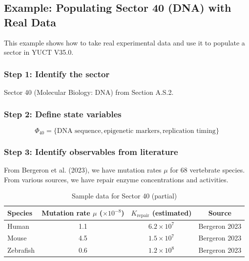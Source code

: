 \documentclass[13pt,a4paper]{article}
\begin{document}
	\subsection*{Example: Populating Sector 40 (DNA) with Real Data}
	
	This example shows how to take real experimental data and use it to populate a sector in YUCT V35.0.
	
	\subsubsection*{Step 1: Identify the sector}
	Sector 40 (Molecular Biology: DNA) from Section A.S.2.
	
	\subsubsection*{Step 2: Define state variables}
	\[
	\Phi_{40} = \{ \text{DNA sequence}, \text{epigenetic markers}, \text{replication timing} \}
	\]
	
	\subsubsection*{Step 3: Identify observables from literature}
	From Bergeron et al. (2023), we have mutation rates \(\mu\) for 68 vertebrate species. From various sources, we have repair enzyme concentrations and activities.
	
	\begin{table}[htbp]
		\centering
		\caption{Sample data for Sector 40 (partial)}
		\begin{tabular}{lccc}
			\toprule
			\textbf{Species} & \textbf{Mutation rate \(\mu\) (\(\times 10^{-8}\))} & \textbf{\(K_{\mathrm{repair}}\) (estimated)} & \textbf{Source} \\
			\midrule
			Human & 1.1 & \(6.2 \times 10^7\) & Bergeron 2023 \\
			Mouse & 4.5 & \(1.5 \times 10^7\) & Bergeron 2023 \\
			Zebrafish & 0.6 & \(1.2 \times 10^8\) & Bergeron 2023 \\
			\bottomrule
		\end{tabular}
	\end{table}
	
\end{document}
